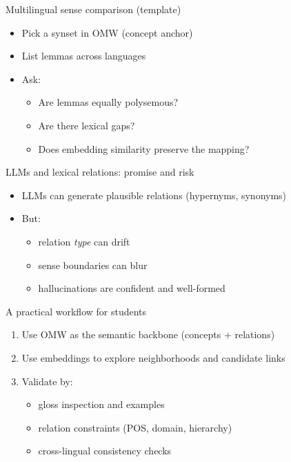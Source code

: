 \documentclass{beamer}
\begin{document}
\begin{frame}{Multilingual sense comparison (template)}
\begin{itemize}
  \item Pick a synset in OMW (concept anchor)
  \item List lemmas across languages
  \item Ask:
  \begin{itemize}
    \item Are lemmas equally polysemous?
    \item Are there lexical gaps?
    \item Does embedding similarity preserve the mapping?
  \end{itemize}
\end{itemize}
\end{frame}

\begin{frame}{LLMs and lexical relations: promise and risk}
\begin{itemize}
  \item LLMs can generate plausible relations (hypernyms, synonyms)
  \item But:
  \begin{itemize}
    \item relation \emph{type} can drift
    \item sense boundaries can blur
    \item hallucinations are confident and well-formed
  \end{itemize}
\end{itemize}
\end{frame}

\begin{frame}{A practical workflow for students}
\begin{enumerate}
  \item Use OMW as the semantic backbone (concepts + relations)
  \item Use embeddings to explore neighborhoods and candidate links
  \item Validate by:
  \begin{itemize}
    \item gloss inspection and examples
    \item relation constraints (POS, domain, hierarchy)
    \item cross-lingual consistency checks
  \end{itemize}
\end{enumerate}
\end{frame}
\end{document}
